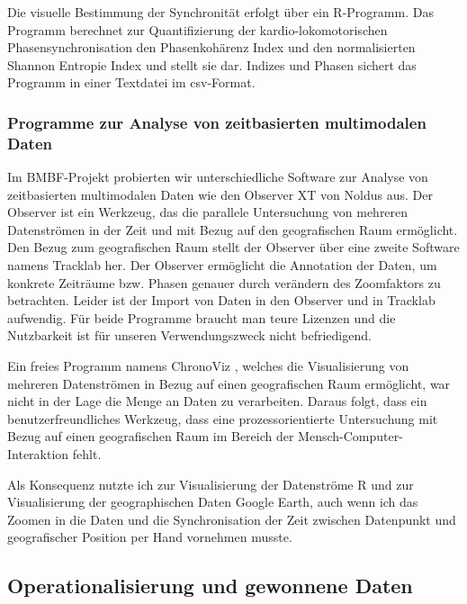 Die visuelle Bestimmung der Synchronität erfolgt über ein R-Programm. Das Programm berechnet zur Quantifizierung der kardio-lokomotorischen Phasensynchronisation den Phasenkohärenz Index \citep{Rosenblum2003} und den normalisierten Shannon Entropie Index \citep{Tass1998, Niizeki2005} und stellt sie dar. Indizes und Phasen sichert das Programm in einer Textdatei im \acs{csv}-Format.

\subsubsection{Programme zur Analyse von zeitbasierten multimodalen Daten} 

\label{ssub:programme_zur_analyse_von_zeitbasierten_multimodalen_daten}

Im \acs{BMBF}-Projekt probierten wir unterschiedliche Software zur Analyse von zeitbasierten multimodalen Daten wie den Observer XT von Noldus aus. Der Observer ist ein Werkzeug, das die parallele Untersuchung von mehreren Datenströmen in der Zeit und mit Bezug auf den geografischen Raum ermöglicht. Den Bezug zum geografischen Raum stellt der Observer über eine zweite Software namens Tracklab her. Der Observer ermöglicht die Annotation der Daten, um konkrete Zeiträume bzw. Phasen genauer durch verändern des Zoomfaktors zu betrachten. Leider ist der Import von Daten in den Observer und in Tracklab aufwendig. Für beide Programme braucht man teure Lizenzen und die Nutzbarkeit ist für unseren Verwendungszweck nicht befriedigend.

Ein freies Programm namens ChronoViz \citep{Fouse2010, Fouse2011}, welches die Visualisierung von mehreren Datenströmen in Bezug auf einen geografischen Raum ermöglicht, war nicht in der Lage die Menge an Daten zu verarbeiten. Daraus folgt, dass ein benutzerfreundliches Werkzeug, dass eine prozessorientierte Untersuchung mit Bezug auf einen geografischen Raum im Bereich der Mensch-Computer-Interaktion fehlt.

Als Konsequenz nutzte ich zur Visualisierung der Datenströme R und zur Visualisierung der geographischen Daten Google Earth, auch wenn ich das Zoomen in die Daten und die Synchronisation der Zeit zwischen Datenpunkt und geografischer Position per Hand vornehmen musste.

\subsection{Operationalisierung und gewonnene Daten} 

